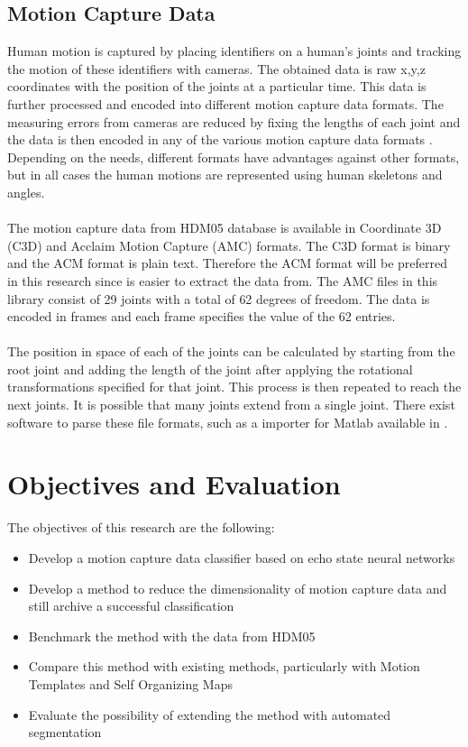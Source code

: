 \documentclass[10pt]{article}
\begin{document}
\subsection{Motion Capture Data}
Human motion is captured by placing identifiers on a human's joints and tracking the motion of these identifiers with cameras. The obtained data is raw x,y,z coordinates with the position of the joints at a particular time. This data is further processed and encoded into different motion capture data formats. The measuring errors from cameras are reduced by fixing the lengths of each joint and the data is then encoded in any of the various motion capture data formats \cite{MocapFormats}. Depending on the needs, different formats have advantages against other formats, but in all cases the human motions are represented using human skeletons and angles.
\\\\
The motion capture data from HDM05 database\cite{MotionTemplatesURL} is available in Coordinate 3D (C3D) and Acclaim Motion Capture (AMC) formats. The C3D format is binary and the ACM format is plain text. Therefore the ACM format will be preferred in this research since is easier to extract the data from. The AMC files in this library consist of 29 joints with a total of 62 degrees of freedom. The data is encoded in frames and each frame specifies the value of the 62 entries. 
\\\\
The position in space of each of the joints can be calculated by starting from the root joint and adding the length of the joint after applying the rotational transformations specified for that joint. This process is then repeated to reach the next joints. It is possible that many joints extend from a single joint. There exist software to parse these file formats, such as a importer for Matlab available in \cite{MotionTemplatesURL}.
\pagebreak
\section{Objectives and Evaluation}

The objectives of this research are the following:
\begin{itemize}
\item Develop a motion capture data classifier based on echo state neural networks
\item Develop a method to reduce the dimensionality of motion capture data and still archive a successful classification
\item Benchmark the method with the data from HDM05 \cite{MotionTemplatesURL}
\item Compare this method with existing methods, particularly with Motion Templates\cite{MotionTemplates} and Self Organizing Maps\cite{EfficientMotionIndexing}
\item Evaluate the possibility of extending the method with automated segmentation
\end{itemize}
\end{document}
